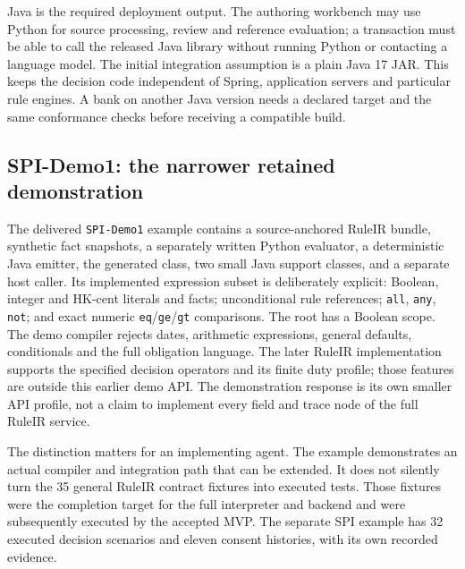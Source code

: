 \documentclass[12pt,a4paper,oneside,openany]{book}
\begin{document}
\label{merge:P-03d-java-delivery:00}

\label{sec:java}

Java is the required deployment output. The authoring workbench may use Python
for source processing, review and reference evaluation; a transaction must be
able to call the released Java library without running Python or contacting a
language model. The initial integration assumption is a plain Java 17 JAR.
This keeps the decision code independent of Spring, application servers and
particular rule engines. A bank on another Java version needs a declared target
and the same conformance checks before receiving a compatible build.

\subsection{SPI-Demo1: the narrower retained demonstration}
\label{merge:P-03d-java-delivery:01}


The delivered \texttt{SPI-Demo1} example contains a source-anchored RuleIR bundle,
synthetic fact snapshots, a separately written Python evaluator, a deterministic
Java emitter, the generated class, two small Java support classes, and a separate
host caller. Its implemented expression subset is deliberately explicit:
Boolean, integer and HK-cent literals and facts; unconditional rule references;
\texttt{all}, \texttt{any}, \texttt{not}; and exact numeric
\texttt{eq}/\texttt{ge}/\texttt{gt} comparisons. The root has a Boolean scope.
The demo compiler rejects dates, arithmetic expressions, general defaults,
conditionals and the full obligation language. The later RuleIR implementation
supports the specified decision operators and its finite duty profile; those
features are outside this earlier demo API. The demonstration response is its own smaller API profile,
not a claim to implement every field and trace node of the full RuleIR service.

The distinction matters for an implementing agent. The example demonstrates an
actual compiler and integration path that can be extended. It does not silently
turn the 35 general RuleIR contract fixtures into executed tests. Those fixtures were the completion target for the full interpreter and
backend and were subsequently executed by the accepted MVP. The separate
SPI example has 32 executed decision scenarios and eleven consent histories, with
its own recorded evidence.
\end{document}

